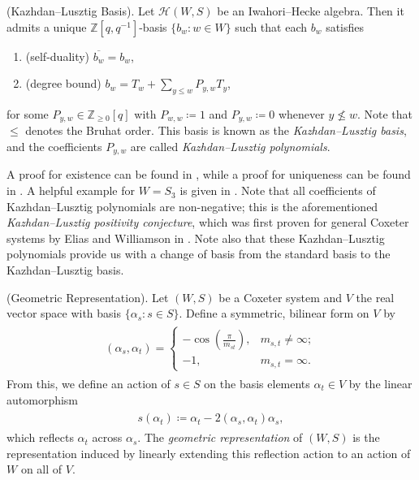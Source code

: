 \noindent\begin{theoremdefinition}\textnormal{(Kazhdan--Lusztig Basis).} Let $\mathscr{H}(W, S)$ be an Iwahori--Hecke algebra. Then it admits a unique $\mathbb{Z}[q, q^{-1}]$-basis $\{b_w : w \in W\}$ such that each $b_w$ satisfies
\begin{enumerate}[label=$\bullet$, leftmargin=4\parindent]
\item (self-duality) $\overline{b_w} = b_w$,
\item (degree bound) $b_w = T_w + \sum_{y \leq w}{P_{y,w} T_y}$,
\end{enumerate}
\noindent for some $P_{y,w} \in \mathbb{Z}_{\geq 0}[q]$ with $P_{w,w} \coloneqq 1$ and $P_{y,w} \coloneqq 0$ whenever $y \nleq w$. Note that $\leq$ denotes the Bruhat order. This basis is known as the {\em Kazhdan--Lusztig basis}, and the coefficients $P_{y,w}$ are called {\em Kazhdan--Lusztig polynomials}.\\
\end{theoremdefinition}

\noindent A proof for existence can be found in \cite[Theorem 3.25]{EMTW20}, while a proof for uniqueness can be found in \cite[Lemma 3.10]{EMTW20}. A helpful example for $W = S_3$ is given in \cite[\S 3.3.1]{EMTW20}. Note that all coefficients of Kazhdan--Lusztig polynomials are non-negative; this is the aforementioned {\em Kazhdan--Lusztig positivity conjecture}, which was first proven for general Coxeter systems by Elias and Williamson in \cite[Corollary 1.2]{EW14}. Note also that these Kazhdan--Lusztig polynomials provide us with a change of basis from the standard basis to the Kazhdan--Lusztig basis.\\

\noindent\begin{definition}\label{GeometricRepresentation}\textnormal{(Geometric Representation).} Let $(W, S)$ be a Coxeter system and $V$ the real vector space with basis $\{\alpha_s : s \in S\}$. Define a symmetric, bilinear form on $V$ by%
\begin{align*}
\begin{split}
(\alpha_s, \alpha_t) = \begin{cases}-\cos\!\left(\frac{\pi}{m_{st}}\right)\!,&m_{s,t} \neq \infty;\\-1,&m_{s,t} = \infty.\end{cases}
\end{split}
\end{align*}
\noindent From this, we define an action of $s \in S$ on the basis elements $\alpha_t \in V$ by the linear automorphism
\begin{align*}
\begin{split}
s(\alpha_t) \coloneqq \alpha_t - 2(\alpha_s, \alpha_t)\alpha_s,
\end{split}
\end{align*}
\noindent which reflects $\alpha_t$ across $\alpha_s$. The {\em geometric representation} of $(W, S)$ is the representation induced by linearly extending this reflection action to an action of $W$ on all of $V$.\\
\end{definition}

